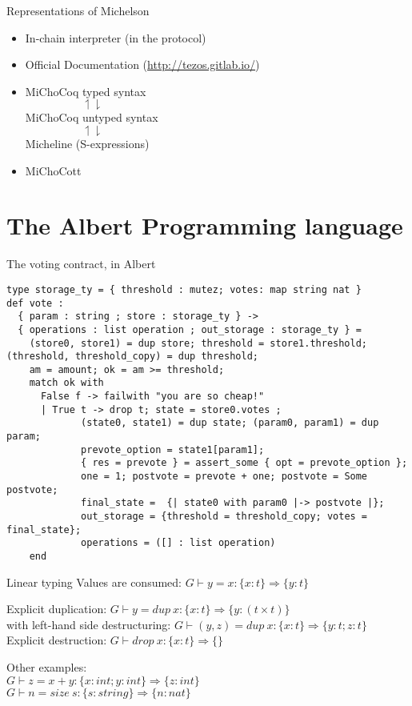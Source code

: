 \documentclass[aspectratio=169]{beamer}
\begin{document}
\begin{frame}{Representations of Michelson}
  \begin{itemize}
    \item In-chain interpreter (in the protocol)
    \item Official Documentation (\url{http://tezos.gitlab.io/})
    \item MiChoCoq typed syntax\\
      $\mspace{90mu}\upharpoonleft \downharpoonright$ \\
      MiChoCoq untyped syntax \\
      $\mspace{90mu}\upharpoonleft \downharpoonright$ \\
      Micheline (S-expressions)
    \item MiChoCott
  \end{itemize}
\end{frame}

\section{The Albert Programming language}

\begin{frame}[fragile]{The voting contract, in Albert}
\begin{lstlisting}[language=albert,basicstyle=\footnotesize]
type storage_ty = { threshold : mutez; votes: map string nat }
def vote :
  { param : string ; store : storage_ty } ->
  { operations : list operation ; out_storage : storage_ty } =
    (store0, store1) = dup store; threshold = store1.threshold; (threshold, threshold_copy) = dup threshold;
    am = amount; ok = am >= threshold;
    match ok with
      False f -> failwith "you are so cheap!"
      | True t -> drop t; state = store0.votes ;
             (state0, state1) = dup state; (param0, param1) = dup param;
             prevote_option = state1[param1];
             { res = prevote } = assert_some { opt = prevote_option };
             one = 1; postvote = prevote + one; postvote = Some postvote;
             final_state =  {| state0 with param0 |-> postvote |};
             out_storage = {threshold = threshold_copy; votes = final_state};
             operations = ([] : list operation)
    end
\end{lstlisting}
\end{frame}

\begin{frame}{Linear typing}
  Values are consumed: $G \vdash y = x : \{ x : t \} \Rightarrow \{ y : t \} $

  Explicit duplication: $G \vdash y = dup\:x : \{ x : t \} \Rightarrow \{ y : (t \times t) \}$\\
  with left-hand side destructuring: $G \vdash (y, z) = dup\:x : \{ x : t \} \Rightarrow \{ y : t; z : t \}$\\
  Explicit destruction: $G \vdash drop\:x : \{ x : t \} \Rightarrow \{\}$

  Other examples:\\
  $G \vdash z = x + y : \{ x : int ; y : int \} \Rightarrow \{ z : int \}$\\
  $G \vdash n = size\:s : \{ s : string \} \Rightarrow \{ n : nat \}$
\end{frame}
\end{document}

